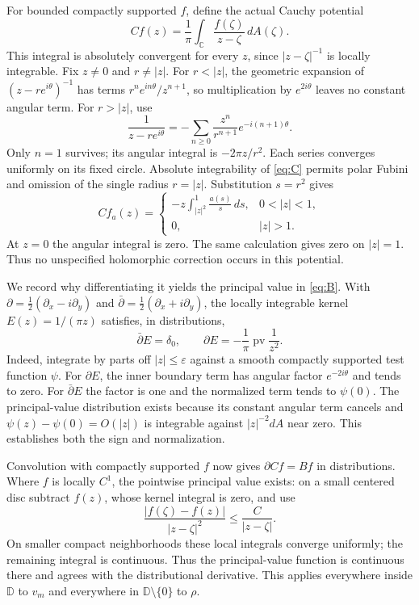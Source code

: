 \documentclass[10pt]{article}
\newcommand{\C}{\mathbb C}
\newcommand{\D}{\mathbb D}
\newcommand{\dd}{\,dA}
\newcommand{\pv}{\operatorname{pv}}
\newcommand{\dbar}{\bar\partial}
\begin{document}
For bounded compactly supported $f$, define the actual Cauchy potential
\begin{equation}\label{eq:C}
 Cf(z)=\frac1\pi\int_{\C}\frac{f(\zeta)}{z-\zeta}\dd(\zeta).
\end{equation}
This integral is absolutely convergent for every $z$, since
$|z-\zeta|^{-1}$ is locally integrable. Fix $z\ne0$ and $r\ne|z|$.
For $r<|z|$, the geometric expansion of $(z-re^{i\theta})^{-1}$ has
terms $r^ne^{in\theta}/z^{n+1}$, so multiplication by $e^{2i\theta}$
leaves no constant angular term. For $r>|z|$, use
\[
 \frac1{z-re^{i\theta}}
   =-\sum_{n\ge0}\frac{z^n}{r^{n+1}}e^{-i(n+1)\theta}.
\]
Only $n=1$ survives; its angular integral is $-2\pi z/r^2$.
Each series converges uniformly on its fixed circle. Absolute
integrability of \eqref{eq:C} permits polar Fubini and omission of the
single radius $r=|z|$. Substitution $s=r^2$ gives
\begin{equation}\label{eq:Ca}
 Cf_a(z)=
 \begin{cases}
 -z\displaystyle\int_{|z|^2}^1\frac{a(s)}s\,ds,&0<|z|<1,\\[1ex]
 0,&|z|>1.
 \end{cases}
\end{equation}
At $z=0$ the angular integral is zero. The same calculation gives zero
on $|z|=1$. Thus no unspecified holomorphic correction occurs in this
potential.

We record why differentiating it yields the principal value in
\eqref{eq:B}. With
$\partial=\tfrac12(\partial_x-i\partial_y)$ and
$\dbar=\tfrac12(\partial_x+i\partial_y)$, the locally integrable
kernel $E(z)=1/(\pi z)$ satisfies, in distributions,
\begin{equation}\label{eq:kernel}
 \dbar E=\delta_0,\qquad
 \partial E=-\frac1\pi\pv\frac1{z^2}.
\end{equation}
Indeed, integrate by parts off $|z|\le\varepsilon$ against a smooth
compactly supported test function $\psi$. For $\partial E$, the inner
boundary term has angular factor $e^{-2i\theta}$ and tends to zero.
For $\dbar E$ the factor is one and the normalized term tends to
$\psi(0)$. The principal-value distribution exists because its constant
angular term cancels and $\psi(z)-\psi(0)=O(|z|)$ is integrable against
$|z|^{-2}dA$ near zero. This establishes both the sign and normalization.

Convolution with compactly supported $f$ now gives
$\partial Cf=Bf$ in distributions. Where $f$ is locally $C^1$, the
pointwise principal value exists: on a small centered disc subtract
$f(z)$, whose kernel integral is zero, and use
\[
 \frac{|f(\zeta)-f(z)|}{|z-\zeta|^2}\le\frac{C}{|z-\zeta|}.
\]
On smaller compact neighborhoods these local integrals converge uniformly;
the remaining integral is continuous. Thus the principal-value function
is continuous there and agrees with the distributional derivative.
This applies everywhere inside $\D$ to $v_m$ and everywhere in
$\D\setminus\{0\}$ to $\rho$.
\end{document}
